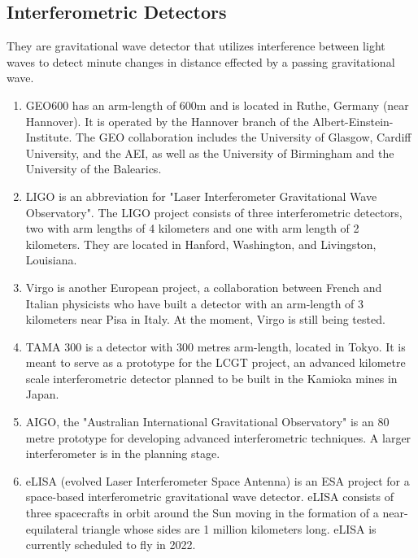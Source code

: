 \documentclass[11]{article}
\begin{document}
\subsection{Interferometric Detectors}
They are gravitational wave detector that utilizes interference between light waves to detect minute changes in distance effected by a passing gravitational wave.
\begin{enumerate}
\item GEO600 has an arm-length of 600m and is located in Ruthe, Germany (near Hannover). It is operated by the Hannover branch of the Albert-Einstein-Institute. The GEO collaboration includes the University of Glasgow, Cardiff University, and the AEI, as well as the University of Birmingham and the University of the Balearics.

\item LIGO is an abbreviation for "Laser Interferometer Gravitational Wave Observatory". The LIGO project consists of three interferometric detectors, two with arm lengths of 4 kilometers and one with arm length of 2 kilometers. They are located in Hanford, Washington, and Livingston, Louisiana.

\item Virgo is another European project, a collaboration between French and Italian physicists who have built a detector with an arm-length of 3 kilometers near Pisa in Italy. At the moment, Virgo is still being tested.

\item TAMA 300 is a detector with 300 metres arm-length, located in Tokyo. It is meant to serve as a prototype for the LCGT project, an advanced kilometre scale interferometric detector planned to be built in the Kamioka mines in Japan.

\item AIGO, the "Australian International Gravitational Observatory" is an 80 metre prototype for developing advanced interferometric techniques. A larger interferometer is in the planning stage.

\item eLISA (evolved Laser Interferometer Space Antenna) is an ESA project for a space-based interferometric gravitational wave detector. eLISA consists of three spacecrafts in orbit around the Sun moving in the formation of a near-equilateral triangle whose sides are 1 million kilometers long. eLISA is currently scheduled to fly in 2022.
\end{enumerate}
\end{document}
